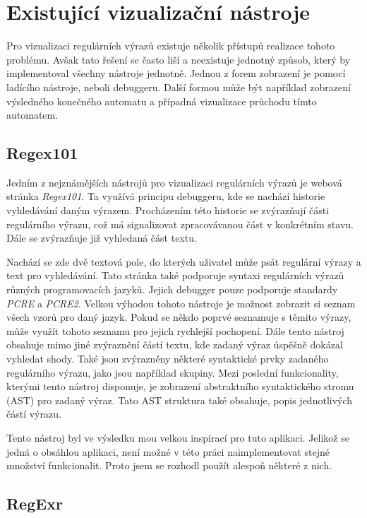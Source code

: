 \chapter{Existující vizualizační nástroje}\label{sec:ExistingApplications}

Pro vizualizaci regulárních výrazů existuje několik přístupů realizace tohoto problému.
Avšak tato řešení se často liší a neexistuje jednotný způsob, který by implementoval všechny nástroje jednotně.
Jednou z forem zobrazení je pomocí ladícího nástroje, neboli debuggeru.
Další formou může být například zobrazení výsledného konečného automatu a případná vizualizace průchodu tímto automatem.

\section{Regex101}

Jedním z nejznámějších nástrojů pro vizualizaci regulárních výrazů je webová stránka \textit{Regex101}\cite{Dib}.
Ta využívá principu debuggeru, kde se nachází historie vyhledávání daným výrazem.
Procházením této historie se zvýrazňují části regulárního výrazu, což má signalizovat zpracovávanou část v konkrétním stavu.
Dále se zvýrazňuje již vyhledaná část textu.

Nachází se zde dvě textová pole, do kterých uživatel může psát regulární výrazy a text pro vyhledávání.
Tato stránka také podporuje syntaxi regulárních výrazů různých programovacích jazyků.
Jejich debugger pouze podporuje standardy \textit{PCRE} a \textit{PCRE2}.
Velkou výhodou tohoto nástroje je možnost zobrazit si seznam všech vzorů pro daný jazyk.
Pokud se někdo poprvé seznamuje s těmito výrazy, může využít tohoto seznamu pro jejich rychlejší pochopení.
Dále tento nástroj obsahuje mimo jiné zvýraznění částí textu, kde zadaný výraz úspěšně dokázal vyhledat shody.
Také jsou zvýrazněny některé syntaktické prvky zadaného regulárního výrazu, jako jsou například skupiny.
Mezi poslední funkcionality, kterými tento nástroj disponuje, je zobrazení abstraktního syntaktického stromu (AST) pro zadaný výraz.
Tato AST struktura také obsahuje, popis jednotlivých částí výrazu.

Tento nástroj byl ve výsledku mou velkou inspirací pro tuto aplikaci. 
Jelikož se jedná o obsáhlou aplikaci, není možné v této práci naimplementovat stejné množství funkcionalit.
Proto jsem se rozhodl použít alespoň některé z nich.

\section{RegExr}

